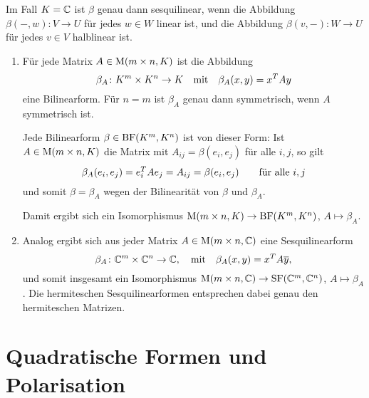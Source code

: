 Im Fall $K = \mathbb{C}$ ist $\beta$ genau dann sesquilinear, wenn die Abbildung $\beta(-,w) \colon V \to U$ für jedes $w \in W$ linear ist, und die Abbildung $\beta(v,-) \colon W \to U$ für jedes $v \in V$ halblinear ist.

\pagebreak

\begin{example}
  \leavevmode
  \begin{enumerate}
    \item
      Für jede Matrix $A \in \operatorname{M}(m \times n, K)$ ist die Abbildung
      \[
                \beta_A
        \colon  K^m \times K^n
        \to     K
        \quad\text{mit}\quad
          \beta_A(x,y)
        = x^T A y
      \]
      eine Bilinearform.
      Für $n = m$ ist $\beta_A$ genau dann symmetrisch, wenn $A$ symmetrisch ist.
      
      Jede Bilinearform $\beta \in \operatorname{BF}(K^m, K^n)$ ist von dieser Form:
      Ist $A \in \operatorname{M}(m \times n, K)$ die Matrix mit $A_{ij} = \beta(e_i, e_j)$ für alle $i, j$, so gilt
      \[
          \beta_A(e_i, e_j)
        = e_i^T A e_j
        = A_{ij}
        = \beta(e_i, e_j)
        \qquad
        \text{für alle $i, j$}
      \]
      und somit $\beta = \beta_A$ wegen der Bilinearität von $\beta$ und $\beta_A$.
      
      Damit ergibt sich ein Isomorphismus $\operatorname{M}(m \times n, K) \to \operatorname{BF}(K^m, K^n)$, $A \mapsto \beta_A$.
      
    \item
      Analog ergibt sich aus jeder Matrix $A \in \operatorname{M}(m \times n, \mathbb{C})$ eine Sesquilinearform
      \[
                \beta_A
        \colon  \mathbb{C}^m \times \mathbb{C}^n
        \to     \mathbb{C},
        \quad\text{mit}\quad
          \beta_A(x,y)
        = x^T A \overline{y},
      \]
      und somit insgesamt ein Isomorphismus $\operatorname{M}(m \times n, \mathbb{C}) \to \operatorname{SF}(\mathbb{C}^m, \mathbb{C}^n)$, $A \mapsto \beta_A$.
      Die hermiteschen Sesquilinearformen entsprechen dabei genau den hermiteschen Matrizen.
  \end{enumerate}
\end{example}





\section{Quadratische Formen und Polarisation}
\label{section: quadratic forms and polarisation}

